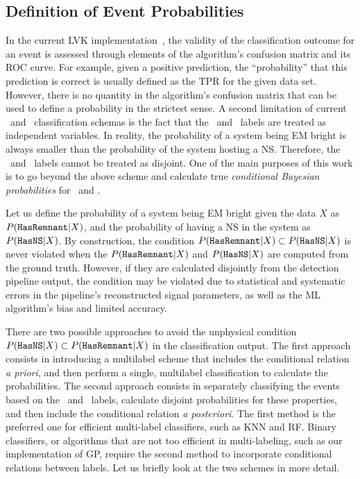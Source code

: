 \subsection*{Definition of Event Probabilities}


In the current \ac{LVK} implementation~\cite{Chatterjee:2019avs}, the validity of the classification outcome for an event is assessed through elements of the algorithm's confusion matrix
and its \ac{ROC} curve. For example, given a positive prediction, the ``probability'' that this prediction is correct is usually defined as the \ac{TPR} for the given data set. However,
there is no quantity in the algorithm's confusion matrix that can be used to define a probability in the strictest sense. A second limitation of current \hasns\ and \hasrem\
classification schemas is the fact that the \hasns\ and \hasrem\ labels are treated as independent variables. In reality, the probability of a system being \ac{EM} bright is always
smaller than the probability of the system hosting a \ac{NS}. Therefore, the \hasns\ and \hasrem\ labels cannot be treated as disjoint. One of the main purposes of this work is to go
beyond the above scheme and calculate true \emph{conditional Bayesian probabilities} for \hasns\ and \hasrem. 

Let us define the probability of a system being \ac{EM} bright given the data $X$ as $P({{\tt HasRemnant}}|X)$, and the probability of having a \ac{NS} in the system as $P({{\tt HasNS}}|X)$. By
construction, the condition $P({{\tt HasRemnant}}|X)\subset P({{\tt HasNS}}|X)$ is never violated when the $P({{\tt HasRemnant}}|X)$ and $P({{\tt HasNS}}|X)$ are computed from the ground truth. However, if they are
calculated disjointly from the detection pipeline output, the condition may be violated due to statistical and systematic errors in the pipeline's reconstructed signal parameters, as
well as the \ac{ML} algorithm's bias and limited accuracy. 

There are two possible approaches to avoid the unphysical condition $P({{\tt HasNS}}|X)\subset P({{\tt HasRemnant}}|X)$ in the classification output. The first approach consists in introducing a
multilabel scheme that includes the conditional relation \emph{a priori}, and then perform a single, multilabel classification to calculate the probabilities. The second approach
consists in separately classifying the events based on the \hasns\ and \hasrem\ labels, calculate disjoint probabilities for these properties, and then include the conditional relation
\emph{a posteriori}. The first method is the preferred one for efficient multi-label classifiers, such as \ac{KNN} and \ac{RF}. Binary classifiers, or algorithms that are not too efficient in multi-labeling, such as our implementation of \ac{GP}, require the second method to incorporate conditional relations between labels. Let us briefly look at the two schemes in more detail.


